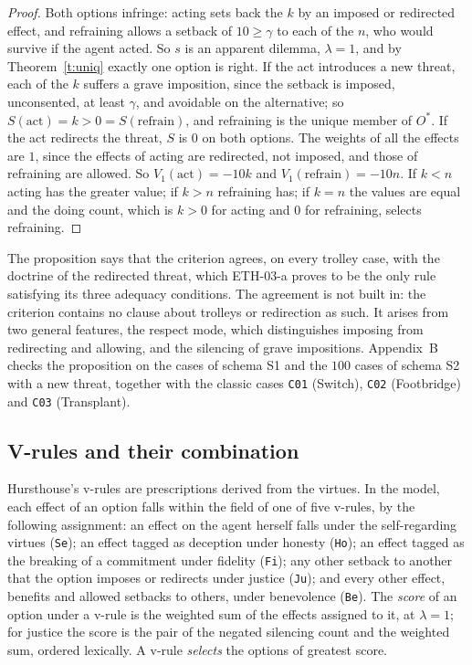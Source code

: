 \documentclass{situationist-preprint}
\begin{document}
\begin{proof}
Both options infringe: acting sets back the $k$ by an imposed or redirected effect, and refraining allows a setback of $10\geq\gamma$ to each of the $n$, who would survive if the agent acted. So $s$ is an apparent dilemma, $\lambda=1$, and by Theorem~\ref{t:uniq} exactly one option is right. If the act introduces a new threat, each of the $k$ suffers a grave imposition, since the setback is imposed, unconsented, at least $\gamma$, and avoidable on the alternative; so $S(\text{act})=k>0=S(\text{refrain})$, and refraining is the unique member of $O^\ast$. If the act redirects the threat, $S$ is $0$ on both options. The weights of all the effects are $1$, since the effects of acting are redirected, not imposed, and those of refraining are allowed. So $V_1(\text{act})=-10k$ and $V_1(\text{refrain})=-10n$. If $k<n$ acting has the greater value; if $k>n$ refraining has; if $k=n$ the values are equal and the doing count, which is $k>0$ for acting and $0$ for refraining, selects refraining.
\end{proof}

The proposition says that the criterion agrees, on every trolley case, with the doctrine of the redirected threat, which ETH-03-a proves to be the only rule satisfying its three adequacy conditions. The agreement is not built in: the criterion contains no clause about trolleys or redirection as such. It arises from two general features, the respect mode, which distinguishes imposing from redirecting and allowing, and the silencing of grave impositions. Appendix~B checks the proposition on the \stnschone{} cases of schema S1 and the $100$ cases of schema S2 with a new threat, together with the classic cases \texttt{C01} (Switch), \texttt{C02} (Footbridge) and \texttt{C03} (Transplant).

\subsection{V-rules and their combination}

Hursthouse's v-rules are prescriptions derived from the virtues. In the model, each effect of an option falls within the field of one of five v-rules, by the following assignment: an effect on the agent herself falls under the self-regarding virtues (\texttt{Se}); an effect tagged as deception under honesty (\texttt{Ho}); an effect tagged as the breaking of a commitment under fidelity (\texttt{Fi}); any other setback to another that the option imposes or redirects under justice (\texttt{Ju}); and every other effect, benefits and allowed setbacks to others, under benevolence (\texttt{Be}). The \emph{score} of an option under a v-rule is the weighted sum of the effects assigned to it, at $\lambda=1$; for justice the score is the pair of the negated silencing count and the weighted sum, ordered lexically. A v-rule \emph{selects} the options of greatest score.
\end{document}
